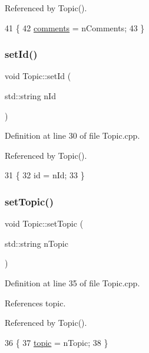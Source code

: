 Referenced by Topic().


\begin{DoxyCode}
41 \{
42     \hyperlink{namespacecomments}{comments} = nComments;
43 \}
\end{DoxyCode}
\mbox{\label{class_topic_a11ecfa79333a902a33398ac628280cfa}} 
\subsubsection{\texorpdfstring{set\+Id()}{setId()}}
{\footnotesize\ttfamily void Topic\+::set\+Id (\begin{DoxyParamCaption}\item[{std\+::string}]{n\+Id }\end{DoxyParamCaption})}



Definition at line 30 of file Topic.\+cpp.



Referenced by Topic().


\begin{DoxyCode}
31 \{
32     \textcolor{keywordtype}{id} = nId;
33 \}
\end{DoxyCode}
\mbox{\label{class_topic_a64ecaea143938ef771830f05b703853f}} 
\subsubsection{\texorpdfstring{set\+Topic()}{setTopic()}}
{\footnotesize\ttfamily void Topic\+::set\+Topic (\begin{DoxyParamCaption}\item[{std\+::string}]{n\+Topic }\end{DoxyParamCaption})}



Definition at line 35 of file Topic.\+cpp.



References topic.



Referenced by Topic().


\begin{DoxyCode}
36 \{
37     \hyperlink{class_topic_ae74abf3428c3d51f0e3c95e995d29633}{topic} = nTopic;
38 \}
\end{DoxyCode}



